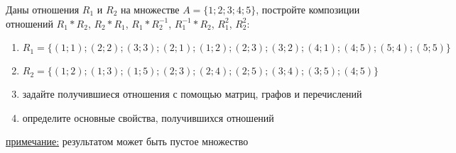 \question
Даны отношения $R_1$ и $R_2$ на множестве $A = \{1; 2; 3; 4; 5\}$, постройте композиции отношений $R_1*R_2$, $R_2*R_1$,  $R_1*R_2^{-1}$, $R_1^{-1}*R_2$, $R_1^2$, $R_2^2$:
\begin{enumerate}
	\renewcommand{\labelenumi}{\alph{enumi})}
	\item $R_1 = \{(1; 1); (2; 2); (3; 3); (2; 1); (1; 2); (2; 3); (3; 2); (4; 1); (4; 5); (5; 4); (5; 5)\}$
	\item $R_2 = \{(1; 2); (1; 3); (1; 5); (2; 3); (2; 4); (2; 5); (3; 4); (3; 5); (4; 5)\}$
	\item задайте получившиеся отношения с помощью матриц, графов и перечислений 
	\item определите основные свойства, получившихся отношений
\end{enumerate}

\underline{примечание:} результатом может быть пустое множество